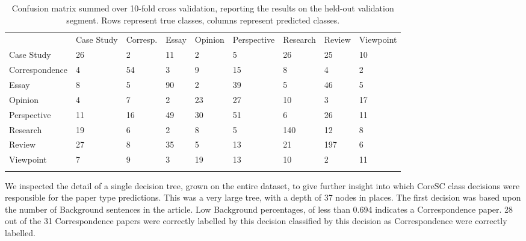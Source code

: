 \documentclass{svmult}
\begin{document}
\begin{table}

\caption{Confusion matrix summed over 10-fold cross validation, reporting the results on the held-out validation segment. Rows represent true classes, columns represent predicted classes.}
\label{tab:confusion}       %

\begin{tabular}{lllllllll}
\hline\noalign{\smallskip}
      &  Case Study   &     Corresp.      &   Essay  & Opinion &     Perspective    &     Research    &     Review  & Viewpoint \\
\noalign{\smallskip}\svhline\noalign{\smallskip}
Case Study    &    26   &     2     &   11    &    2  &      5 & 26       & 25 &       10 \\
Correspondence  &      4  &      54   &     3    &    9     &   15 & 8   &     4 &       2 \\
Essay      &  8     &   5    &   90    &    2 &       39      &  5 & 46    &    5 \\
Opinion    &    4   &     7 &       2   &     23      &  27     &   10   &  3  &      17 \\
Perspective &       11  &      16    &    49       & 30      &  51 & 6      &  26    &   11 \\
Research      &  19    &    6 &       2 &       8    &    5      &  140  &   12    &    8\\
Review       & 27     &   8     &   35    &    5      &  13    &    21   &  197 &       6\\
Viewpoint    &    7  &      9   &     3     &   19     &   13 & 10     &   2  &      11 \\
\noalign{\smallskip}\hline\noalign{\smallskip}
\end{tabular}
\end{table}




We inspected the detail of a single decision tree, grown on the entire dataset,
to give further insight into which CoreSC class decisions were responsible for
the paper type predictions. This was a very large tree, with a depth of 37
nodes in places.  The first decision was based upon the number of Background
sentences in the article. Low Background percentages, of less than 0.694
indicates a Correspondence paper. 28 out of the 31 Correspondence papers were
correctly labelled by this decision  classified by this decision as
Correspondence were correctly labelled.
\end{document}
